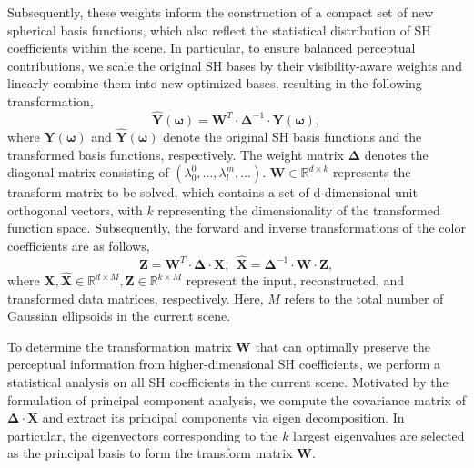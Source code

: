 \documentclass[lettersize,journal]{IEEEtran}
\begin{document}
Subsequently, these weights inform the construction of a compact set of new spherical basis functions, which also reflect the statistical distribution of SH coefficients within the scene.
In particular, to ensure balanced perceptual contributions, we scale the original SH bases by their visibility-aware weights and linearly combine them into new optimized bases, resulting in the following transformation,
\begin{equation}
    \hat{\boldsymbol{Y}}(\boldsymbol{\omega}) = \boldsymbol{W}^T \cdot\boldsymbol{\Delta}^{-1}\cdot \boldsymbol{Y}(\boldsymbol{\omega}),
\end{equation}
where $\boldsymbol{Y}(\boldsymbol{\omega})$ and $\hat{\boldsymbol{Y}}(\boldsymbol{\omega})$ denote the original SH basis functions and the transformed basis functions, respectively. The weight matrix $\boldsymbol{\Delta}$ denotes the diagonal matrix consisting of $(\lambda_0^0, ...,\lambda_l^m,...)$. $\boldsymbol{W}\in \mathbb{R}^{d\times k}$ represents the transform matrix to be solved, which contains a set of d-dimensional unit orthogonal vectors, with $k$ representing the dimensionality of the transformed function space.
Subsequently, the forward and inverse transformations of the color coefficients are as follows,
\begin{equation}
    \boldsymbol{Z}=\boldsymbol{W}^{T}\cdot \boldsymbol{\Delta}\cdot  \boldsymbol{X},\ \ \hat{\boldsymbol{X}}=\boldsymbol{\Delta}^{-1}\cdot \boldsymbol{W}\cdot  \boldsymbol{Z},
\end{equation}
where $\boldsymbol{X},\hat{\boldsymbol{X}}\in \mathbb{R}^{d\times M}, \boldsymbol{Z}\in \mathbb{R}^{k\times M}$ represent the input, reconstructed, and transformed data matrices, respectively. Here, $M$ refers to the total number of Gaussian ellipsoids in the current scene.

To determine the transformation matrix $\boldsymbol{W}$ that can optimally preserve the perceptual information from higher-dimensional SH coefficients, we perform a statistical analysis on all SH coefficients in the current scene. Motivated by the formulation of principal component analysis, we compute the covariance matrix of $\boldsymbol{\Delta}\cdot \boldsymbol{X}$ and extract its principal components via eigen decomposition.
In particular, the eigenvectors corresponding to the $k$ largest eigenvalues are selected as the principal basis to form the transform matrix $\boldsymbol{W}$.

\end{document}
